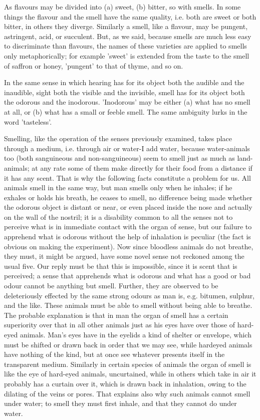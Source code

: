 As flavours may be divided into (a) sweet, (b) bitter, so with smells.
In some things the flavour and the smell have the same quality, i.e.
both are sweet or both bitter, in others they diverge. Similarly a
smell, like a flavour, may be pungent, astringent, acid, or succulent.
But, as we said, because smells are much less easy to discriminate
than flavours, the names of these varieties are applied to smells
only metaphorically; for example 'sweet' is extended from the taste
to the smell of saffron or honey, 'pungent' to that of thyme, and
so on. 

In the same sense in which hearing has for its object both the audible
and the inaudible, sight both the visible and the invisible, smell
has for its object both the odorous and the inodorous. 'Inodorous'
may be either (a) what has no smell at all, or (b) what has a small
or feeble smell. The same ambiguity lurks in the word 'tasteless'.

Smelling, like the operation of the senses previously examined, takes
place through a medium, i.e. through air or water-I add water, because
water-animals too (both sanguineous and non-sanguineous) seem to smell
just as much as land-animals; at any rate some of them make directly
for their food from a distance if it has any scent. That is why the
following facts constitute a problem for us. All animals smell in
the same way, but man smells only when he inhales; if he exhales or
holds his breath, he ceases to smell, no difference being made whether
the odorous object is distant or near, or even placed inside the nose
and actually on the wall of the nostril; it is a disability common
to all the senses not to perceive what is in immediate contact with
the organ of sense, but our failure to apprehend what is odorous without
the help of inhalation is peculiar (the fact is obvious on making
the experiment). Now since bloodless animals do not breathe, they
must, it might be argued, have some novel sense not reckoned among
the usual five. Our reply must be that this is impossible, since it
is scent that is perceived; a sense that apprehends what is odorous
and what has a good or bad odour cannot be anything but smell. Further,
they are observed to be deleteriously effected by the same strong
odours as man is, e.g. bitumen, sulphur, and the like. These animals
must be able to smell without being able to breathe. The probable
explanation is that in man the organ of smell has a certain superiority
over that in all other animals just as his eyes have over those of
hard-eyed animals. Man's eyes have in the eyelids a kind of shelter
or envelope, which must be shifted or drawn back in order that we
may see, while hardeyed animals have nothing of the kind, but at once
see whatever presents itself in the transparent medium. Similarly
in certain species of animals the organ of smell is like the eye of
hard-eyed animals, uncurtained, while in others which take in air
it probably has a curtain over it, which is drawn back in inhalation,
owing to the dilating of the veins or pores. That explains also why
such animals cannot smell under water; to smell they must first inhale,
and that they cannot do under water. 

